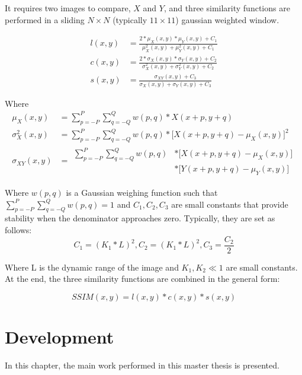 \documentclass{cslthse-msc}
\begin{document}
It requires two images to compare, $X$ and $Y$, and three similarity functions are performed in a sliding $N\times N$ (typically $11\times 11$) gaussian weighted window.

\begin{equation}\label{eq:ssim_components}
\begin{split}
l(x,y) & = \frac{2*\mu_X(x,y)*\mu_Y(x,y)+C_1}{\mu_X^2(x,y)+\mu_Y^2(x,y)+C_1} \\ 
c(x,y) & = \frac{2*\sigma_X(x,y)*\sigma_Y(x,y)+C_2}{\sigma_X^2(x,y)+\sigma_Y^2(x,y)+C_2} \\ 
s(x,y) & = \frac{\sigma_{XY}(x,y)+C_3}{\sigma_X(x,y)+\sigma_Y(x,y)+C_3}
\end{split}
\end{equation}

Where
\begin{equation*}
\begin{split}
\mu_X(x,y) & = \sum\limits_{p=-P}^{P} \sum\limits_{q=-Q}^{Q} w(p,q)*X(x+p,y+q)\\ 
\sigma_X^2(x,y) & = \sum\limits_{p=-P}^{P} \sum\limits_{q=-Q}^{Q} w(p,q)*\lbrack X(x+p,y+q)-\mu_X(x,y) \rbrack^2\\ 
\sigma_{XY}(x,y) & = \begin{split}\sum\limits_{p=-P}^{P} \sum\limits_{q=-Q}^{Q} w(p,q)& *\lbrack X(x+p,y+q)-\mu_X(x,y)\rbrack \\ & *\lbrack Y(x+p,y+q)-\mu_Y(x,y)\rbrack\end{split}
\end{split}
\end{equation*}

Where $w(p,q)$ is a Gaussian weighing function such that $\sum\limits_{p=-P}^{P} \sum\limits_{q=-Q}^{Q} w(p,q)=1$ and $C_1,C_2,C_3$ are small constants that provide stability when the denominator approaches zero. Typically, they are set as follows: 
\begin{equation*}
	C_1=(K_1*L)^2,C_2=(K_1*L)^2,C_3=\frac{C_2}{2}
\end{equation*}

Where L is the dynamic range of the image and $K_1,K_2\ll1$ are small constants. At the end, the three similarity functions are combined in the general form: 

\begin{equation}\label{eq:ssim}
SSIM(x,y)=l(x,y)*c(x,y)*s(x,y)
\end{equation}



\chapter{Development}
In this chapter, the main work performed in this master thesis is presented.
\end{document}

